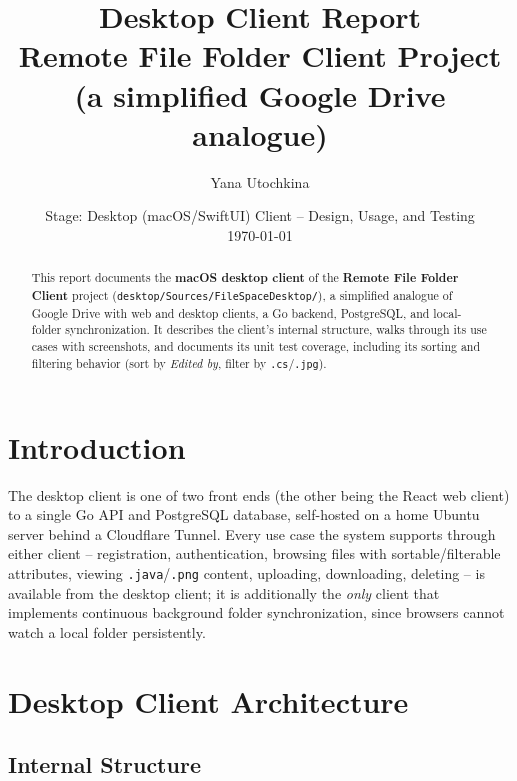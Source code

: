 \documentclass[12pt,a4paper]{article}
\title{\textbf{Desktop Client Report\\[2pt] \large Remote File Folder Client Project\\(a simplified Google Drive analogue)}}
\author{Yana Utochkina}
\date{Stage: Desktop (macOS/SwiftUI) Client -- Design, Usage, and Testing \\ \today}
\begin{document}
\maketitle

\begin{abstract}
\noindent
This report documents the \textbf{macOS desktop client} of the \textbf{Remote File Folder Client} project (\texttt{desktop/Sources/FileSpaceDesktop/}), a simplified analogue of Google Drive with web and desktop clients, a Go backend, PostgreSQL, and local-folder synchronization. It describes the client's internal structure, walks through its use cases with screenshots, and documents its unit test coverage, including its sorting and filtering behavior (sort by \emph{Edited by}, filter by \texttt{.cs}/\texttt{.jpg}).
\end{abstract}

\tableofcontents
\newpage

\section{Introduction}

The desktop client is one of two front ends (the other being the React web client) to a single Go API and PostgreSQL database, self-hosted on a home Ubuntu server behind a Cloudflare Tunnel. Every use case the system supports through either client -- registration, authentication, browsing files with sortable/filterable attributes, viewing \texttt{.java}/\texttt{.png} content, uploading, downloading, deleting -- is available from the desktop client; it is additionally the \emph{only} client that implements continuous background folder synchronization, since browsers cannot watch a local folder persistently.

\section{Desktop Client Architecture}

\subsection{Internal Structure}
\end{document}
